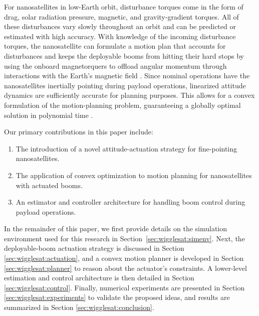 For nanosatellites in low-Earth orbit, disturbance torques come in the form of drag, solar radiation pressure, magnetic, and gravity-gradient torques. All of these disturbances vary slowly throughout an orbit and can be predicted or estimated with high accuracy.  With knowledge of the incoming disturbance torques, the nanosatellite can formulate a motion plan that accounts for disturbances and keeps the deployable booms from hitting their hard stops by using the onboard magnetorquers to offload angular momentum through interactions with the Earth's magnetic field \cite{gatherer2019,markley2014}. Since nominal operations have the nanosatellites inertially pointing during payload operations, linearized attitude dynamics are sufficiently accurate for planning purposes. This allows for a convex formulation of the motion-planning problem, guaranteeing a globally optimal solution in polynomial time \cite{boyd2004}. 

Our primary contributions in this paper include:
\begin{enumerate}
\item The introduction of a novel attitude-actuation strategy for fine-pointing nanosatellites.
\vspace{+2mm}
\vspace{+2mm}
\item The application of convex optimization to motion planning for nanosatellites with actuated booms.
\vspace{+2mm}
\item An estimator and controller architecture for handling boom control during payload operations.
\end{enumerate}

In the remainder of this paper, we first provide details on the simulation environment used for this research in Section~\ref{sec:wigglesat:simenv}. Next, the deployable-boom actuation strategy is discussed in Section \ref{sec:wigglesat:actuation}, and a convex motion planner is developed in Section \ref{sec:wigglesat:planner} to reason about the actuator's constraints.  A lower-level estimation and control architecture is then detailed in Section \ref{sec:wigglesat:control}. Finally, numerical experiments are presented in Section \ref{sec:wigglesat:experiments} to validate the proposed ideas, and results are summarized in Section \ref{sec:wigglesat:conclusion}.

